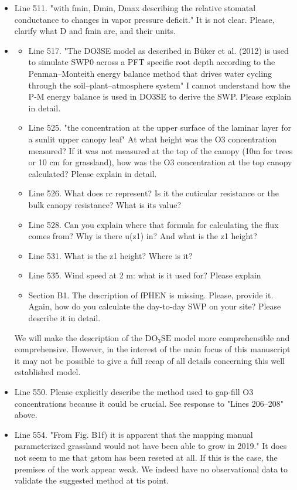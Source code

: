 \documentclass{scrartcl}
\begin{document}
\begin{itemize}
\item {\color{blue}Line 511. "with fmin, Dmin, Dmax describing the relative stomatal conductance to changes in vapor pressure deficit." It is not clear. Please, clarify what D and fmin are, and their units.}

\item {\color{blue}
\begin{itemize}
    \item Line 517. "The DO3SE model as described in Büker et al. (2012) is used to simulate SWP0 across a PFT specific root depth according to the Penman--Monteith energy balance method that drives water cycling through the soil--plant--atmosphere system" I cannot understand how the P-M energy balance is used in DO3SE to derive the SWP. Please explain in detail.

    \item Line 525.  "the concentration at the upper surface of the laminar layer for a sunlit upper canopy leaf" At what height was the O3 concentration measured? If it was not measured at the top of the canopy (10m for trees or 10 cm for grassland), how was the O3 concentration at the top canopy calculated? Please explain in detail.

    \item Line 526.  What does rc represent? Is it the cuticular resistance or the bulk canopy resistance? What is its value?

    \item Line 528.  Can you explain where that formula for calculating the flux comes from? Why is there u(z1) in? And what is the z1 height?

    \item Line 531. What is the z1 height? Where is it?

    \item Line 535. Wind speed at 2 m: what is it used for? Please explain
    
    \item Section B1. The description of fPHEN is missing. Please, provide it. Again, how do you calculate the day-to-day SWP on your site? Please describe it in detail.
\end{itemize} }
We will make the description of the $\mathrm{DO_3SE}$ model more comprehensible and comprehensive. However, in the interest of the main focus of this manuscript it may not be possible to give a full recap of all details concerning this well established model.

\item {\color{blue}Line 550. Please explicitly describe the method used to gap-fill O3 concentrations because it could be crucial.}
See response to "Lines 206--208" above.


\item {\color{blue}Line 554. "From Fig. B1f) it is apparent that the mapping manual parameterized grassland would not have been able to grow in 2019." 
It does not seem to me that gstom has been reseted at all. If this is the case, the premises of the work appear weak.}
We indeed have no observational data to validate the suggested method at tis point.

\end{itemize}
\end{document}
